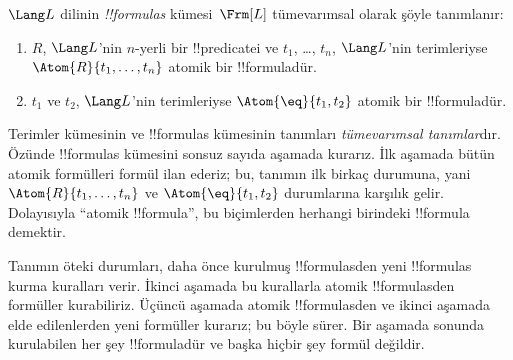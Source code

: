 \begin{defn}[Formüller]
$\Lang L$ dilinin \emph{!!{formula}s} kümesi~$\Frm[L]$ tümevarımsal
olarak şöyle tanımlanır:
\begin{enumerate}


\item $R$, $\Lang L$'nin $n$-yerli bir !!{predicate}{}i ve $t_1$, \dots,
  $t_n$, $\Lang L$'nin terimleriyse $\Atom{R}{t_1,\ldots, t_n}$ atomik bir
  !!{formula}{}dür.

\item $t_1$ ve $t_2$, $\Lang L$'nin terimleriyse $\Atom{\eq}{t_1, t_2}$
  atomik bir !!{formula}{}dür.








\end{enumerate}
\end{defn}

\begin{explain}
Terimler kümesinin ve !!{formula}s kümesinin tanımları
\emph{tümevarımsal tanımlar}dır. Özünde !!{formula}s kümesini sonsuz
sayıda aşamada kurarız. İlk aşamada bütün atomik formülleri formül ilan
ederiz; bu, tanımın ilk birkaç durumuna, yani
%
%
$\Atom{R}{t_1,\dots,t_n}$ ve $\Atom{\eq}{t_1,t_2}$ durumlarına karşılık
gelir. Dolayısıyla ``atomik !!{formula}'', bu biçimlerden herhangi birindeki
!!{formula} demektir.

Tanımın öteki durumları, daha önce kurulmuş !!{formula}s{}den yeni
!!{formula}s kurma kuralları verir. İkinci aşamada bu kurallarla atomik
!!{formula}s{}den formüller kurabiliriz. Üçüncü aşamada atomik
!!{formula}s{}den ve ikinci aşamada elde edilenlerden yeni formüller kurarız;
bu böyle sürer. Bir aşamada sonunda kurulabilen her şey !!{formula}{}dür
ve başka hiçbir şey formül değildir.
\end{explain}

